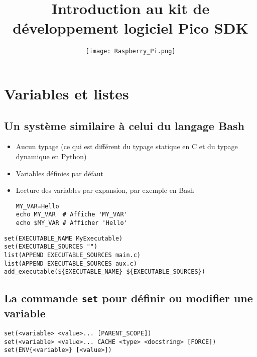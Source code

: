 \documentclass{beamer}
\title{Introduction au kit de développement logiciel Pico SDK}
\author{
   \texttt{[image: Raspberry\_Pi.png]}
}
\newenvironment{Frame}{\begin{frame}[containsverbatim]{\subsecname}}{\end{frame}}
\begin{document}
\begin{frame}
    \maketitle
\end{frame}

\begin{frame}
    \small
    \tableofcontents
\end{frame}

\section{Variables et listes}

\subsection{Un système similaire à celui du langage Bash}

\begin{Frame}
    \begin{itemize}
        \item Aucun typage (ce qui est différent du typage statique en C et du typage dynamique en Python)
        \item Variables définies par défaut
        \item Lecture des variables par expansion, par exemple en Bash
        \begin{verbatim}
MY_VAR=Hello
echo MY_VAR  # Affiche 'MY_VAR'
echo $MY_VAR # Afficher 'Hello'
        \end{verbatim}
    \end{itemize}
\end{Frame}

\begin{Frame}
    \begin{verbatim}
set(EXECUTABLE_NAME MyExecutable)
set(EXECUTABLE_SOURCES "")
list(APPEND EXECUTABLE_SOURCES main.c)
list(APPEND EXECUTABLE_SOURCES aux.c)
add_executable(${EXECUTABLE_NAME} ${EXECUTABLE_SOURCES})
    \end{verbatim}
\end{Frame}

\subsection{La commande \texttt{set} pour définir ou modifier une variable}

\begin{Frame}
    \small
    \begin{verbatim}
set(<variable> <value>... [PARENT_SCOPE])
set(<variable> <value>... CACHE <type> <docstring> [FORCE])
set(ENV{<variable>} [<value>])
    \end{verbatim}
\end{Frame}
\end{document}
